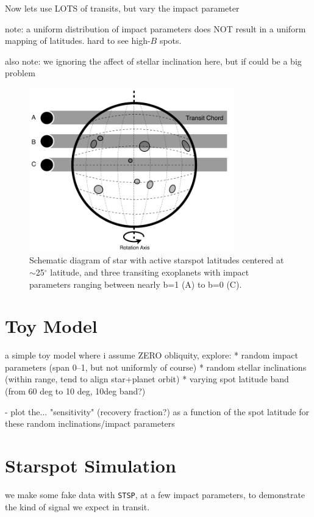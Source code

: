 \documentclass[preprint2]{aastex61}
\begin{document}
Now lets use LOTS of transits, but vary the impact parameter

note: a uniform distribution of impact parameters does NOT result in a uniform mapping of latitudes. hard to see high-$B$ spots.

also note: we ignoring the affect of stellar inclination here, but if could be a big problem

\begin{figure}[!t]
\centering
\includegraphics[width=3.5in]{diagram1}
\caption{
Schematic diagram of star with active starspot latitudes centered at $\sim$25$^\circ$ latitude, and three transiting exoplanets with impact parameters ranging between nearly b=1 (A) to  b=0 (C).
}
\label{fig:diagram}
\end{figure}



\section{Toy Model}
a simple toy model where i assume ZERO obliquity, explore:
* random impact parameters (span 0--1, but not uniformly of course)
* random stellar inclinations (within range, tend to align star+planet orbit)
* varying spot latitude band (from 60 deg to 10 deg, 10deg band?)

- plot the... "sensitivity" (recovery fraction?) as a function of the spot latitude for these random inclinations/impact parameters


\section{Starspot Simulation}
we make some fake data with {\tt STSP}, at a few impact parameters, to demonstrate the kind of signal we expect in transit.
\end{document}
